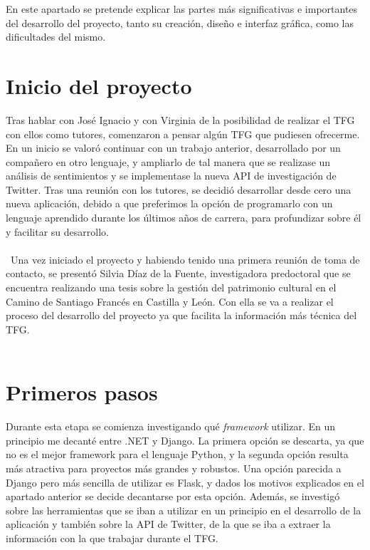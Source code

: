 En este apartado se pretende explicar las partes más significativas e importantes del desarrollo del proyecto, tanto su creación, diseño e interfaz gráfica, como las dificultades del mismo.

\section{Inicio del proyecto}
Tras hablar con José Ignacio y con Virginia de la posibilidad de realizar el TFG con ellos como tutores, comenzaron a pensar algún TFG que pudiesen ofrecerme. \\
En un inicio se valoró continuar con un trabajo anterior, desarrollado por un compañero en otro lenguaje, y ampliarlo de tal manera que se realizase un análisis de sentimientos y se implementase la nueva API de investigación de Twitter. Tras una reunión con los tutores, se decidió desarrollar desde cero una nueva aplicación, debido a que preferimos la opción de programarlo con un lenguaje aprendido durante los últimos años de carrera, para profundizar sobre él y facilitar su desarrollo. \\
\\\
Una vez iniciado el proyecto y habiendo tenido una primera reunión de toma de contacto, se presentó Silvia Díaz de la Fuente, investigadora predoctoral que se encuentra realizando una tesis sobre la gestión del patrimonio cultural en el Camino de Santiago Francés en Castilla y León. Con ella se va a realizar el proceso del desarrollo del proyecto ya que facilita la información más técnica del TFG.
\\\
\section{Primeros pasos}
Durante esta etapa se comienza investigando qué \textit{framework} utilizar. En un principio me decanté entre .NET y Django. La primera opción se descarta, ya que no es el mejor framework para el lenguaje Python, y la segunda opción resulta más atractiva para proyectos más grandes y robustos. Una opción parecida a Django pero más sencilla de utilizar es Flask, y dados los motivos explicados en el apartado anterior se decide decantarse por esta opción.
Además, se investigó sobre las herramientas que se iban a utilizar en un principio en el desarrollo de la aplicación y también sobre la API de Twitter, de la que se iba a extraer la información con la que trabajar durante el TFG.

